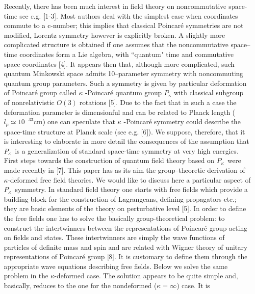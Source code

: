 \documentclass[a4paper,a4paper]{article}
\begin{document}
Recently, there has been much interest in field theory on
noncommutative space-time  see e.g. [1-3]. Most authors deal with
the simplest case when coordinates commute to a c-number; this
implies that
 classical Poincar\'{e} symmetries are not modified,
 Lorentz symmetry however is explicitly broken. A slightly
more complicated structure is obtained if one assumes that the
 noncommutative space--time coordinates form a Lie algebra,
  with ``quantum" time
 and commutative space   coordinates [4]. It appears then that,
although
more complicated, such quantum Minkowski space admits
10--parameter
symmetry  with  noncommuting quantum group parameters.
Such a symmetry  is given by particular   deformation of Poincar\'{e} group called $\kappa$%
-Poincar\'{e} quantum group $P_{\kappa}$ with classical subgroup
of
 nonrelativistic $O(3)$ rotations [5]. Due to the fact
that in such a case the
deformation parameter is  dimensionful
 and can be related to Planck length ($l_{p} \simeq 10^{-33}$cm)
 one can speculate that
$\kappa$%
-Poincar\'{e}  symmetry could describe the space-time structure
at Planck scale  (see e.g. [6]). We suppose, therefore, that it
  is interesting to elaborate in
more detail the consequences of the assumption  that
$P_{\kappa}$\ is a generalization of standard space-time symmetry
at very high energies. First steps towards the construction of
quantum field theory based on $P_{\kappa}$\ were made recently in
[7]. This paper has as its aim the group--theoretic derivation of
$\kappa$-deformed
 free field theories.
\newline
We would like to discuss here a particular  aspect of
$P_{\kappa}$\ symmetry. In standard field  theory one starts with
free fields which provide a building block for the construction of
Lagrangeans,  defining propagators etc.; they are basic elements
of the theory on perturbative level [5]. In order to define the
free fields one has to solve the basically group-theoretical
problem: to construct the intertwinners between the
representations of Poincar\'{e} group acting on fields  and
states. These intertwinners are simply the wave functions of
particles of definite mass and spin and are related with Wigner
theory of unitary representations of Poincar\'{e} group [8]. It is
customary to define them through the appropriate wave equations
describing free fields.
\newline Below we
solve the same problem in the          $\kappa$-deformed case. The
solution appears to be quite simple and, basically, reduces to
the one for the nondeformed ($\kappa=\infty$) case. It is
\end{document}
